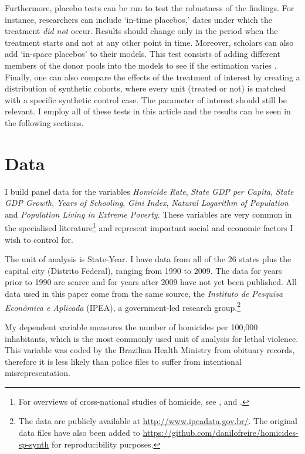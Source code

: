 Furthermore, placebo tests can be run to test the robustness of the findings. For instance, researchers can include `in-time placebos,' dates under which the treatment \emph{did not} occur. Results should change only in the period when the treatment starts and not at any other point in time. Moreover, scholars can also add `in-space placebos' to their models. This test consists of adding different members of the donor pools into the models to see if the estimation varies \citep{abadie2014}. Finally, one can also compare the effects of the treatment of interest by creating a distribution of synthetic cohorts, where every unit (treated or not) is matched with a specific synthetic control case. The parameter of interest should still be relevant. I employ all of these tests in this article and the results can be seen in the following sections.

\section{Data}
\label{sec:data}

I build panel data for the variables \emph{Homicide Rate}, \emph{State GDP per Capita}, \emph{State GDP Growth}, \emph{Years of Schooling}, \emph{Gini Index}, \emph{Natural Logarithm of Population} and \emph{Population Living in Extreme Poverty}. These variables are very common in the specialised literature\footnote{For overviews of cross-national studies of homicide, see \citet{lafree1999summary}, \citet{nivette2011cross} and \citet{trent2012review}.} and represent important social and economic factors I wish to control for. 

The unit of analysis is State-Year. I have data from all of the 26 states plus the capital city (Distrito Federal), ranging from 1990 to 2009. The data for years prior to 1990 are scarce and for years after 2009 have not yet been published. All data used in this paper come from the same source, the \emph{Instituto de Pesquisa Econômica e Aplicada} (IPEA), a government-led research group.\footnote{The data are publicly available at \url{http://www.ipeadata.gov.br/}. The original data files have also been added to \url{https://github.com/danilofreire/homicides-sp-synth} for reproducibility purposes.}

My dependent variable measures the number of homicides per 100,000 inhabitants, which is the most commonly used unit of analysis for lethal violence. This variable was coded by the Brazilian Health Ministry from obituary records, therefore it is less likely than police files to suffer from intentional misrepresentation. 


